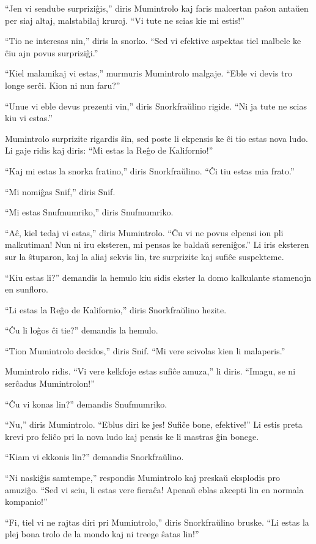 ``Jen vi sendube surpriziĝis,'' diris Mumintrolo kaj faris malcertan paŝon antaŭen per siaj altaj, malstabilaj kruroj. ``Vi tute ne scias kie mi estis!''

``Tio ne interesas nin,'' diris la snorko. ``Sed vi efektive aspektas tiel malbele ke ĉiu ajn povus surpriziĝi.''

``Kiel malamikaj vi estas,'' murmuris Mumintrolo malgaje. ``Eble vi devis tro longe serĉi. Kion ni nun faru?''

``Unue vi eble devus prezenti vin,'' diris Snorkfraŭlino rigide. ``Ni ja tute ne scias kiu vi estas.''

Mumintrolo surprizite rigardis ŝin, sed poste li ekpensis ke ĉi tio estas nova ludo. Li gaje ridis kaj diris: ``Mi estas la Reĝo de Kalifornio!''

``Kaj mi estas la snorka fratino,'' diris Snorkfraŭlino. ``Ĉi tiu estas mia frato.''

``Mi nomiĝas Snif,'' diris Snif.

``Mi estas Snufmumriko,'' diris Snufmumriko.

``Aĉ, kiel tedaj vi estas,'' diris Mumintrolo. ``Ĉu vi ne povus elpensi ion pli malkutiman! Nun ni iru eksteren, mi pensas ke baldaŭ sereniĝos.'' Li iris eksteren sur la ŝtuparon, kaj la aliaj sekvis lin, tre surprizite kaj sufiĉe suspekteme.

``Kiu estas li?'' demandis la hemulo kiu sidis ekster la domo kalkulante stamenojn en sunfloro.

``Li estas la Reĝo de Kalifornio,'' diris Snorkfraŭlino hezite.

``Ĉu li loĝos ĉi tie?'' demandis la hemulo.

``Tion Mumintrolo decidos,'' diris Snif. ``Mi vere scivolas kien li malaperis.''

Mumintrolo ridis. ``Vi vere kelkfoje estas sufiĉe amuza,'' li diris. ``Imagu, se ni serĉadus Mumintrolon!''

``Ĉu vi konas lin?'' demandis Snufmumriko.

``Nu,'' diris Mumintrolo. ``Eblus diri ke jes! Sufiĉe bone, efektive!'' Li estis preta krevi pro feliĉo pri la nova ludo kaj pensis ke li mastras ĝin bonege.

``Kiam vi ekkonis lin?'' demandis Snorkfraŭlino.

``Ni naskiĝis samtempe,'' respondis Mumintrolo kaj preskaŭ eksplodis pro amuziĝo. ``Sed vi sciu, li estas vere fieraĉa! Apenaŭ eblas akcepti lin en normala kompanio!''

``Fi, tiel vi ne rajtas diri pri Mumintrolo,'' diris Snorkfraŭlino bruske. ``Li estas la plej bona trolo de la mondo kaj ni treege ŝatas lin!''

